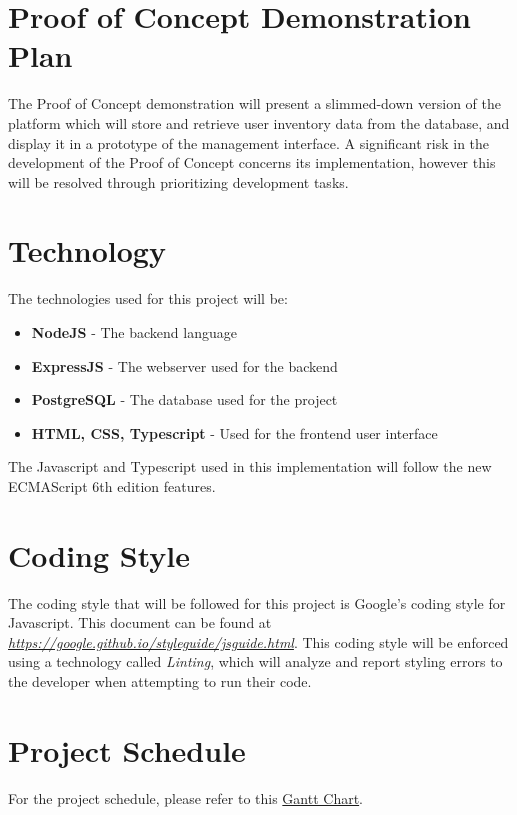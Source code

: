 \documentclass{article}
\begin{document}
\section{Proof of Concept Demonstration Plan}
The Proof of Concept demonstration will present a slimmed-down version of the platform which will store and retrieve user inventory data from the database, and display it in a prototype of the management interface. A significant risk in the development of the Proof of Concept concerns its implementation, however this will be resolved through prioritizing development tasks.

\section{Technology}
The technologies used for this project will be:
\begin{itemize}
    \item \textbf{NodeJS} - The backend language
    \item \textbf{ExpressJS} - The webserver used for the backend
    \item \textbf{PostgreSQL} - The database used for the project
    \item \textbf{HTML, CSS, Typescript} - Used for the frontend user interface
\end{itemize}

The Javascript and Typescript used in this implementation will follow the new ECMAScript 6th edition features.

\section{Coding Style}
The coding style that will be followed for this project is Google's coding style for Javascript. This document can be found at \href{https://google.github.io/styleguide/jsguide.html}{\textit{https://google.github.io/styleguide/jsguide.html}}. This coding style will be enforced using a technology called \textit{Linting}, which will analyze and report styling errors to the developer when attempting to run their code.

\section{Project Schedule}
For the project schedule, please refer to this \href{group33-project-schedule.pdf}{Gantt Chart}.
\end{document}
